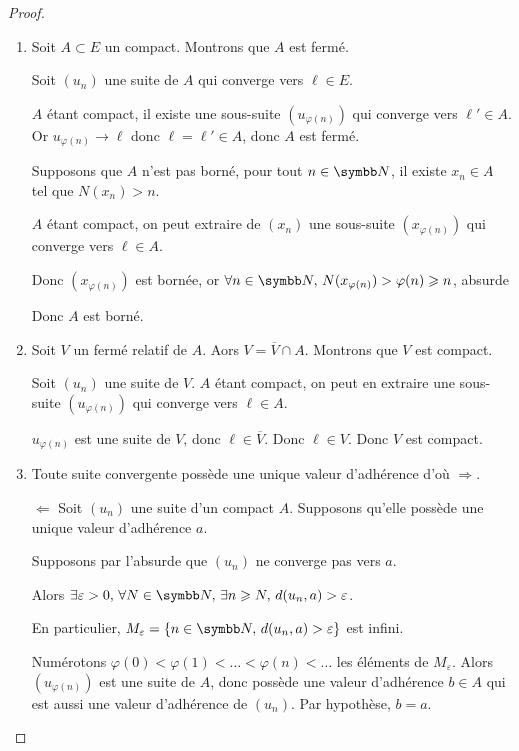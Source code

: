 \begin{proof}~
    \begin{enumerate}
        \item Soit $A \subset E$ un compact. Montrons que $A$ est fermé.

        Soit $(u_n)$ une suite de $A$ qui converge vers $\ell \in E$.

        $A$ étant compact, il existe une sous-suite $(u_{\varphi(n)})$ qui converge vers
        $\ell' \in A$. Or $u_{\varphi(n)} \to \ell$ donc $\ell = \ell' \in A$, donc $A$ est fermé.

        Supposons que $A$ n'est pas borné, pour tout $n \in \N$, il existe 
        $x_n \in A$ tel que $N(x_n) > n$.

        $A$ étant compact, on peut extraire de $(x_n)$ une sous-suite $(x_{\varphi(n)})$ qui converge vers $\ell \in A$.

        Donc $(x_{\varphi(n)})$ est bornée, or $\forall n \in \N, \, N(x_{\varphi(n)}) > \varphi(n) \geqslant n$, absurde 

        Donc $A$ est borné.

        \item Soit $V$ un fermé relatif de $A$. Aors $V = \overline V \cap A$. Montrons 
        que $V$ est compact. 

        Soit $(u_n)$ une suite de $V$. $A$ étant compact, on peut en extraire 
        une sous-suite $(u_{\varphi(n)})$ qui converge vers $\ell \in A$.

        $u_{\varphi(n)} $ est une suite de $V$, donc $\ell \in \overline V$. Donc 
        $\ell \in V$. Donc $V$ est compact.

        \item Toute suite convergente possède une unique valeur d'adhérence d'où $\Rightarrow$. 

        $\Leftarrow$ Soit $(u_n)$ une suite d'un compact $A$. Supposons qu'elle possède 
        une unique valeur d'adhérence $a$.

        Supposons par l'absurde que $(u_n)$ ne converge pas vers $a$.

        Alors $ \exists \varepsilon > 0, \, \forall N \in \N, \, \exists n \geqslant N, \, d(u_n, a) > \varepsilon$.

        En particulier, $M_\varepsilon = \{ n \in \N, \, d(u_n, a) > \varepsilon \}$ est infini. 

        Numérotons $\varphi(0) < \varphi(1) < \ldots < \varphi(n) < \ldots$ les éléments
        de $M_\varepsilon$. Alors $(u_{\varphi(n)})$ est une suite de $A$, donc 
        possède une valeur d'adhérence $b \in A$ qui est aussi une valeur d'adhérence de 
        $(u_n)$. Par hypothèse, $b = a$.


\end{enumerate}
\end{proof}
